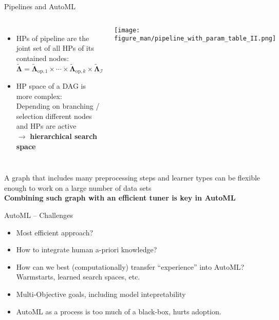 \documentclass[11pt,compress,t,notes=noshow, xcolor=table]{beamer}
\begin{document}
\begin{vbframe}{Pipelines and AutoML}
\begin{columns}
\begin{itemize}
    \item HPs of pipeline are the joint set of all HPs of its contained nodes:\\
    $\tilde{\bm\Lambda}=\tilde{\bm\Lambda}_{\mathrm{op}, 1} \times \cdots \times \tilde{\bm\Lambda}_{\mathrm{op}, k} \times \tilde{\bm\Lambda}_{\mathcal{I}}$
    \item HP space of a DAG is more complex:\\
    Depending on branching / selection different nodes and HPs are active\\ $\rightarrow$ \textbf{hierarchical search space}
\end{itemize}
\begin{center}
\texttt{[image: figure\_man/pipeline\_with\_param\_table\_II.png]}
\end{center}
\end{columns}%
\vspace{1em}

A graph that includes many preprocessing steps and learner types can be flexible enough to work on a large number of data sets\\
\vspace{1em}
\textbf{Combining such graph with an efficient tuner is key in AutoML}
\end{vbframe}



\begin{frame}{AutoML -- Challenges}
\begin{itemize}
    \item Most efficient approach? 
    \item How to integrate human a-priori knowledge?
    \item How can we best (computationally) transfer ``experience'' into AutoML?
    Warmstarts, learned search spaces, etc. 
    \item Multi-Objective goals, including model intepretability
    \item AutoML as a process is too much of a black-box, hurts adoption.
\end{itemize}
\end{frame}


\endlecture
\end{document}
